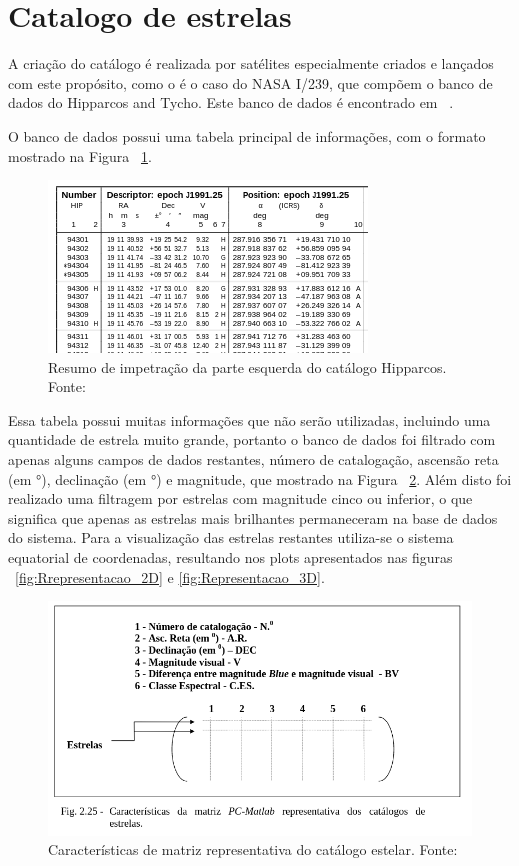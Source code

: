 \section{Catalogo de estrelas}
\label{sec:catalogo_de_estrelas}

A criação do catálogo é realizada por satélites especialmente criados e lançados com este propósito, como o é o caso do NASA I/239, que compõem o banco de dados do Hipparcos and Tycho. Este banco de dados é encontrado em ~\cite[]{ESA}.

O banco de dados possui uma tabela principal de informações, com o formato mostrado na Figura ~\ref{fig:Resumo_impetracao_parte_esquerda_Hipparcos}.

\begin{figure}[H]
	\centering
	\includegraphics[width=.7\columnwidth]{images/Resumo_impetracao_parte_esquerda_Hipparcos.png}
	\caption{Resumo de impetração da parte esquerda do catálogo Hipparcos. Fonte: ~\cite[]{ESA}}
	\label{fig:Resumo_impetracao_parte_esquerda_Hipparcos}
\end{figure}

Essa tabela possui muitas informações que não serão utilizadas, incluindo uma quantidade de estrela muito grande, 
portanto o banco de dados foi filtrado com apenas alguns campos de dados restantes, número de catalogação, ascensão reta (em °), 
declinação (em °) e magnitude, que mostrado na Figura ~\ref{fig:Caracteristicas_matriz}. 
Além disto foi realizado uma filtragem por estrelas com magnitude cinco ou inferior, 
o que significa que apenas as estrelas mais brilhantes permaneceram na base de dados do sistema. 
Para a visualização das estrelas restantes utiliza-se o sistema equatorial de coordenadas, resultando nos plots apresentados nas figuras ~\ref{fig:Rrepresentacao_2D} e \ref{fig:Representacao_3D}.

\begin{figure}[H]
	\centering
	\includegraphics[width=.7\columnwidth, trim={0 60 0 0}, clip]{images/Caracteristicas_matriz.png}
	\caption{Características de matriz representativa do catálogo estelar. Fonte: ~\cite[]{Carvalho}}
	\label{fig:Caracteristicas_matriz}
\end{figure}

